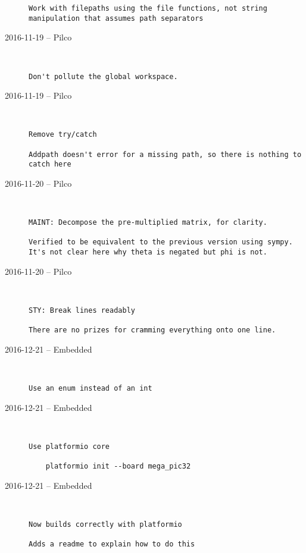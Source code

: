 \begin{description}
\begin{lstlisting}
Work with filepaths using the file functions, not string manipulation that assumes path separators
\end{lstlisting}


  \item[2016-11-19 -- Pilco] \hfill \
\begin{lstlisting}
Don't pollute the global workspace.
\end{lstlisting}


  \item[2016-11-19 -- Pilco] \hfill \
\begin{lstlisting}
Remove try/catch

Addpath doesn't error for a missing path, so there is nothing to catch here
\end{lstlisting}


  \item[2016-11-20 -- Pilco] \hfill \
\begin{lstlisting}
MAINT: Decompose the pre-multiplied matrix, for clarity.

Verified to be equivalent to the previous version using sympy.
It's not clear here why theta is negated but phi is not.
\end{lstlisting}


  \item[2016-11-20 -- Pilco] \hfill \
\begin{lstlisting}
STY: Break lines readably

There are no prizes for cramming everything onto one line.
\end{lstlisting}


  \item[2016-12-21 -- Embedded] \hfill \
\begin{lstlisting}
Use an enum instead of an int
\end{lstlisting}


  \item[2016-12-21 -- Embedded] \hfill \
\begin{lstlisting}
Use platformio core

    platformio init --board mega_pic32
\end{lstlisting}


  \item[2016-12-21 -- Embedded] \hfill \
\begin{lstlisting}
Now builds correctly with platformio

Adds a readme to explain how to do this
\end{lstlisting}



\end{description}

